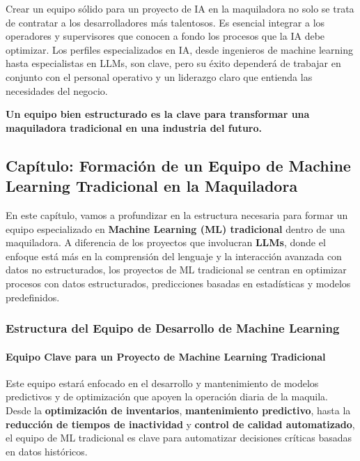 \documentclass[
  10pt,
  letterpaper,
]{book}
\let\oldparagraph\paragraph
\renewcommand{\paragraph}[1]{\oldparagraph{#1}\mbox{}}
\begin{document}
Crear un equipo sólido para un proyecto de IA en la maquiladora no solo
se trata de contratar a los desarrolladores más talentosos. Es esencial
integrar a los operadores y supervisores que conocen a fondo los
procesos que la IA debe optimizar. Los perfiles especializados en IA,
desde ingenieros de machine learning hasta especialistas en LLMs, son
clave, pero su éxito dependerá de trabajar en conjunto con el personal
operativo y un liderazgo claro que entienda las necesidades del negocio.

\textbf{Un equipo bien estructurado es la clave para transformar una
maquiladora tradicional en una industria del futuro.}

\subsection{\texorpdfstring{Capítulo: \textbf{Formación de un Equipo de
Machine Learning Tradicional en la
Maquiladora}}{Capítulo: Formación de un Equipo de Machine Learning Tradicional en la Maquiladora}}\label{capuxedtulo-formaciuxf3n-de-un-equipo-de-machine-learning-tradicional-en-la-maquiladora}

En este capítulo, vamos a profundizar en la estructura necesaria para
formar un equipo especializado en \textbf{Machine Learning (ML)
tradicional} dentro de una maquiladora. A diferencia de los proyectos
que involucran \textbf{LLMs}, donde el enfoque está más en la
comprensión del lenguaje y la interacción avanzada con datos no
estructurados, los proyectos de ML tradicional se centran en optimizar
procesos con datos estructurados, predicciones basadas en estadísticas y
modelos predefinidos.

\subsubsection{\texorpdfstring{\textbf{Estructura del Equipo de
Desarrollo de Machine
Learning}}{Estructura del Equipo de Desarrollo de Machine Learning}}\label{estructura-del-equipo-de-desarrollo-de-machine-learning}

\paragraph{\texorpdfstring{\textbf{Equipo Clave para un Proyecto de
Machine Learning
Tradicional}}{Equipo Clave para un Proyecto de Machine Learning Tradicional}}\label{equipo-clave-para-un-proyecto-de-machine-learning-tradicional}

Este equipo estará enfocado en el desarrollo y mantenimiento de modelos
predictivos y de optimización que apoyen la operación diaria de la
maquila. Desde la \textbf{optimización de inventarios},
\textbf{mantenimiento predictivo}, hasta la \textbf{reducción de tiempos
de inactividad} y \textbf{control de calidad automatizado}, el equipo de
ML tradicional es clave para automatizar decisiones críticas basadas en
datos históricos.
\end{document}
